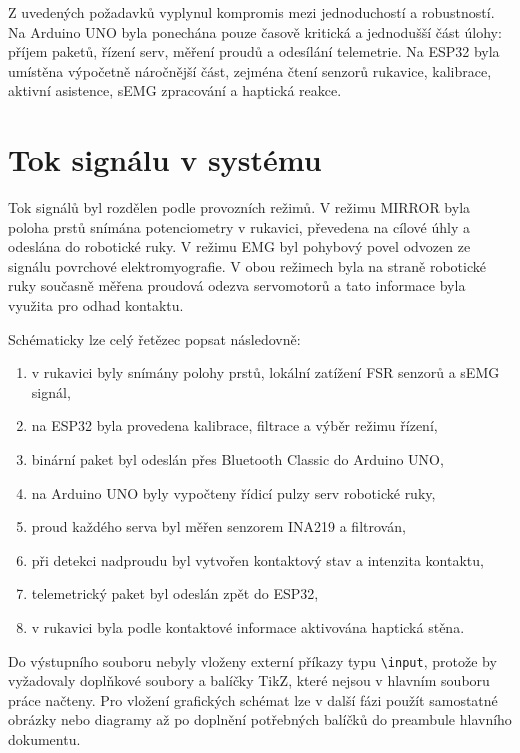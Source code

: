 Z uvedených požadavků vyplynul kompromis mezi jednoduchostí a robustností. Na Arduino UNO byla ponechána pouze časově kritická a jednodušší část úlohy: příjem paketů, řízení serv, měření proudů a odesílání telemetrie. Na ESP32 byla umístěna výpočetně náročnější část, zejména čtení senzorů rukavice, kalibrace, aktivní asistence, sEMG zpracování a haptická reakce.

\section{Tok signálu v systému}
\label{sec:tok-signalu}

Tok signálů byl rozdělen podle provozních režimů. V režimu MIRROR byla poloha prstů snímána potenciometry v rukavici, převedena na cílové úhly a odeslána do robotické ruky. V režimu EMG byl pohybový povel odvozen ze signálu povrchové elektromyografie. V obou režimech byla na straně robotické ruky současně měřena proudová odezva servomotorů a tato informace byla využita pro odhad kontaktu.

Schématicky lze celý řetězec popsat následovně:

\begin{enumerate}
    \item v rukavici byly snímány polohy prstů, lokální zatížení FSR senzorů a sEMG signál,
    \item na ESP32 byla provedena kalibrace, filtrace a výběr režimu řízení,
    \item binární paket byl odeslán přes Bluetooth Classic do Arduino UNO,
    \item na Arduino UNO byly vypočteny řídicí pulzy serv robotické ruky,
    \item proud každého serva byl měřen senzorem INA219 a filtrován,
    \item při detekci nadproudu byl vytvořen kontaktový stav a intenzita kontaktu,
    \item telemetrický paket byl odeslán zpět do ESP32,
    \item v rukavici byla podle kontaktové informace aktivována haptická stěna.
\end{enumerate}

Do výstupního souboru nebyly vloženy externí příkazy typu \texttt{\textbackslash input}, protože by vyžadovaly doplňkové soubory a balíčky TikZ, které nejsou v hlavním souboru práce načteny. Pro vložení grafických schémat lze v další fázi použít samostatné obrázky nebo diagramy až po doplnění potřebných balíčků do preambule hlavního dokumentu.

